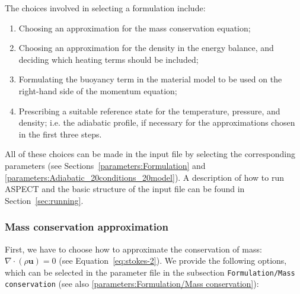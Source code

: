 \documentclass{article}
\newcommand{\aspect}{\textsc{ASPECT}}
\begin{document}
The choices involved in selecting a formulation include:
\begin{enumerate}
\item Choosing an approximation for the mass conservation equation;
\item Choosing an approximation for the density in the energy balance, and deciding which heating terms should be included;
\item Formulating the buoyancy term in the material model to be used on the right-hand side of the momentum equation;
\item Prescribing a suitable reference state for the temperature, pressure, and density; i.e. the adiabatic profile,
if necessary for the approximations chosen in the first three steps.
\end{enumerate}

All of these choices can be made in the input file by selecting the corresponding parameters (see Sections~\ref{parameters:Formulation} and \ref{parameters:Adiabatic_20conditions_20model}).
A description of how to run \aspect{} and the basic structure of the input file can be found in
Section~\ref{sec:running}.

\subsubsection{Mass conservation approximation}
\label{sec:mass-conservation-approximation}

First, we have to choose how to approximate the conservation of mass: $\nabla \cdot (\rho \mathbf u) = 0$ (see Equation~\eqref{eq:stokes-2}).
We provide the following options, which can be selected in the parameter file in the subsection
\texttt{Formulation/Mass conservation} (see also \ref{parameters:Formulation/Mass conservation}):
\end{document}
